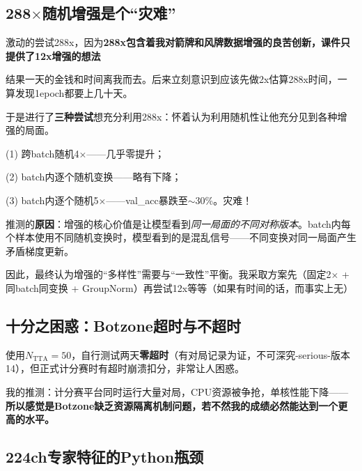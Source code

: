 \documentclass{article}
\begin{document}
\subsection{288$\times$随机增强是个``灾难''}
\label{sec:fail_288}

激动的尝试288x，因为\textbf{288x包含着我对箭牌和风牌数据增强的良苦创新，课件只提供了12x增强的想法}

结果一天的金钱和时间离我而去。后来立刻意识到应该先做2x估算288x时间，一算发现1epoch都要上几十天。

于是进行了\textbf{三种尝试}想充分利用288x：怀着认为利用随机性让他充分见到各种增强的局面。

(1) 跨batch随机4$\times$——几乎零提升；

(2) batch内逐个随机变换——略有下降；

(3) batch内逐个随机5$\times$——val\_acc暴跌至$\sim$30\%。灾难！

推测的\textbf{原因}：增强的核心价值是让模型看到\emph{同一局面的不同对称版本}。batch内每个样本使用不同随机变换时，模型看到的是混乱信号——不同变换对同一局面产生矛盾梯度更新。

因此，最终认为增强的``多样性''需要与``一致性''平衡。我采取方案先（固定2$\times$ + 同batch同变换 + GroupNorm）再尝试12x等等（如果有时间的话，而事实上无）

\subsection{十分之困惑：Botzone超时与不超时}
\label{sec:fail_timeout}

使用$N_{\text{TTA}}\!=\!50$，自行测试两天\textbf{零超时}（有对局记录为证，不可深究-serious-版本14），但正式计分赛时有超时崩溃扣分，非常让人困惑。

我的推测：计分赛平台同时运行大量对局，CPU资源被争抢，单核性能下降——
\textbf{所以感觉是Botzone缺乏资源隔离机制问题，若不然我的成绩必然能达到一个更高的水平。}

\subsection{224ch专家特征的Python瓶颈}
\label{sec:fail_224ch}
\end{document}
